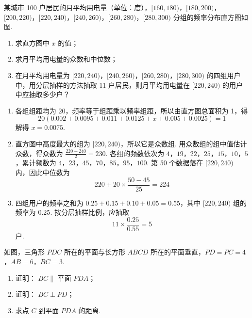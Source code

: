 \begin{problem}
某城市 100 户居民的月平均用电量（单位：\(\text{度}\)），\([160, 180)\)，\([180, 200)\)，\([200, 220)\)，\([220, 240)\)，\([240, 260)\)，\([260, 280)\)，\([280, 300)\) 分组的频率分布直方图如图.

\begin{enumerate}
\item 求直方图中 \(x\) 的值；
\item 求月平均用电量的众数和中位数；
\item 在月平均用电量为 \([220, 240)\)，\([240, 260)\)，\([260, 280)\)，\([280, 300)\) 的四组用户中，用分层抽样的方法抽取 11 户居民，则月平均用电量在 \([220, 240)\) 的用户中应抽取多少户？
\end{enumerate}
\end{problem}

\begin{solution}
\begin{enumerate}
\item 各组组距均为 \(20\)，频率等于组距乘以频率组距，所以由直方图总面积为 1，得
\[
20\left(0.002+0.0095+0.011+0.0125+x+0.005+0.0025\right)=1
\]
解得 \(x=0.0075\).

\item 直方图中高度最大的组为 \([220,240)\)，所以它是众数组. 用众数组的组中值估计众数，得众数为 \(\frac{220+240}{2}=230\). 各组的频数依次为 \(4\)，\(19\)，\(22\)，\(25\)，\(15\)，\(10\)，\(5\)，累计频数为 \(4\)，\(23\)，\(45\)，\(70\)，\(85\)，\(95\)，\(100\). 第 50 个数据落在 \([220,240)\) 内，因此中位数为
\[
220+20\times\frac{50-45}{25}=224
\]

\item 四组用户的频率之和为 \(0.25+0.15+0.10+0.05=0.55\)，其中 \([220,240)\) 组的频率为 \(0.25\). 按分层抽样比例，应抽取
\[
11\times\frac{0.25}{0.55}=5
\]
户.
\end{enumerate}
\end{solution}

\begin{problem}
如图，三角形 \(PDC\) 所在的平面与长方形 \(ABCD\) 所在的平面垂直，\(PD = PC = 4\)，\(AB = 6\)，\(BC = 3\).
\begin{enumerate}
\item 证明： \(BC \parallel\) 平面 \(PDA\)；
\item 证明： \(BC \perp PD\)；
\item 求点 \(C\) 到平面 \(PDA\) 的距离.
\end{enumerate}
\end{problem}

